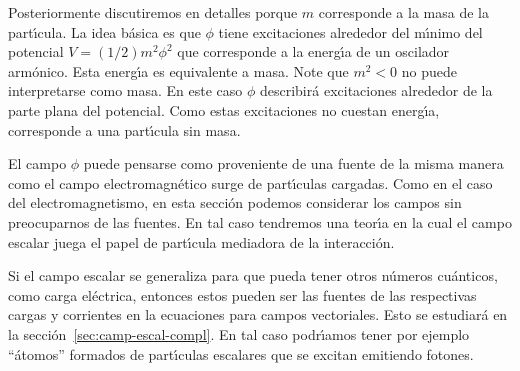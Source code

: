 Posteriormente discutiremos en detalles porque $m$ corresponde a la masa de la part\'\i cula. La idea b\'asica es que $\phi$ tiene excitaciones alrededor del m\'\i nimo del potencial $V=(1/2)m^2\phi^2$ que corresponde a la energ\'\i a de un oscilador arm\'onico. Esta energ\'\i a es equivalente a masa. Note que $m^2\lt 0$ no puede interpretarse como masa. En este caso $\phi$ describir\'a excitaciones alrededor de la parte plana del potencial. Como estas excitaciones no cuestan energ\'\i a, corresponde a una part\'\i cula sin masa. 

El campo $\phi$ puede pensarse como proveniente de una fuente de la misma manera como el campo electromagn\'etico surge de part\'\i culas cargadas. Como en el caso del electromagnetismo, en esta secci\'on podemos considerar los campos sin preocuparnos de las fuentes. 
En tal caso tendremos una teor\'\i a en la cual el campo escalar juega el papel de part\'\i cula mediadora de la interacci\'on.

Si el campo escalar se generaliza para que pueda tener otros n\'umeros
cu\'anticos, como carga el\'ectrica, entonces estos pueden ser las fuentes
de las respectivas cargas y corrientes en la ecuaciones para campos
vectoriales. Esto se estudiar\'a en la
secci\'on~\ref{sec:camp-escal-compl}. En tal caso podr\'\i amos tener por
ejemplo ``\'atomos'' formados de part\'\i culas escalares que se excitan
emitiendo fotones.


